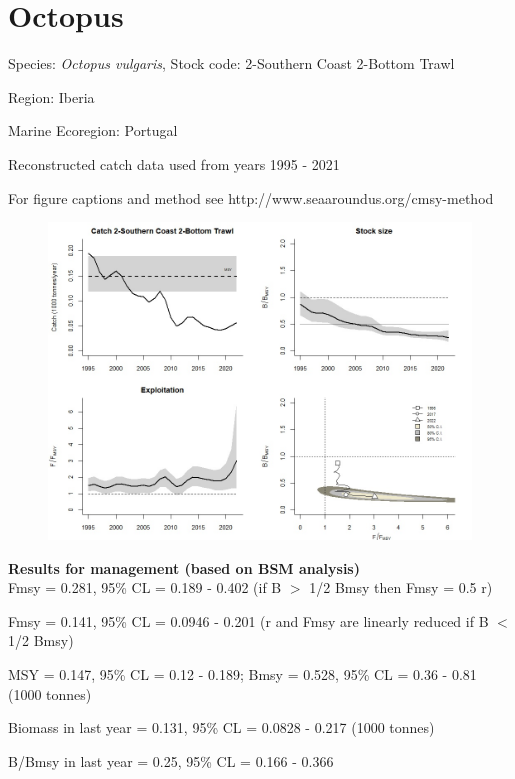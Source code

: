 \documentclass[12pt,a4paper]{article}\usepackage[]{graphicx}\usepackage[]{xcolor}
\begin{document}
    \section*{Octopus}


    Species: \emph{Octopus vulgaris}, Stock code: 2-Southern Coast 2-Bottom Trawl

Region: Iberia

Marine Ecoregion: Portugal

Reconstructed catch data used from years 1995 - 2021 

 For figure captions and method see http://www.seaaroundus.org/cmsy-method

    \begin{figure}[ht]
    \centering
    \includegraphics[width=1.00\textwidth ext=.jpg type=jpg]{2-Southern Coast 2-Bottom Trawl_MAN.jpg}
    \end{figure}

    \textbf{Results for management (based on BSM analysis)}\\

Fmsy = 0.281, 95\% CL = 0.189 - 0.402 (if B $>$ 1/2 Bmsy then Fmsy = 0.5 r)

Fmsy = 0.141, 95\% CL = 0.0946 - 0.201 (r and Fmsy are linearly reduced if B $<$ 1/2 Bmsy)

MSY = 0.147,  95\% CL = 0.12 - 0.189; Bmsy = 0.528,  95\% CL = 0.36 - 0.81 (1000 tonnes)

Biomass in last year = 0.131, 95\% CL = 0.0828 - 0.217 (1000 tonnes)

B/Bmsy in last year = 0.25, 95\% CL = 0.166 - 0.366
\end{document}
